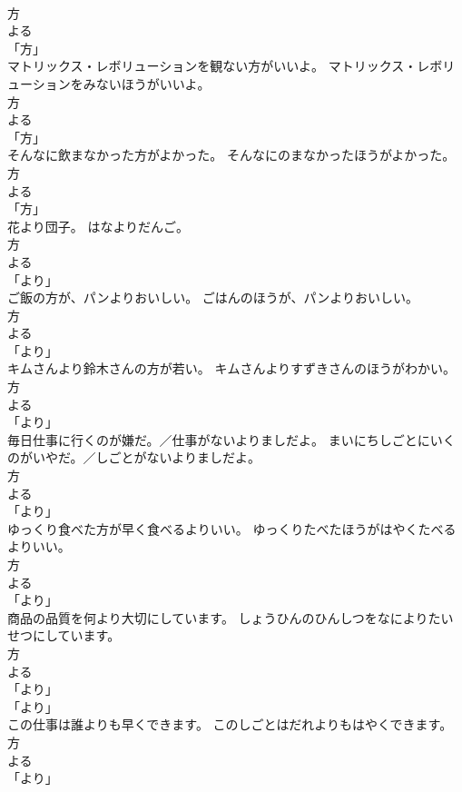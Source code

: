 \documentclass[8pt]{extreport}
\begin{document}
\begin{CJK}{UTF8}{min}
\\	方 
\\	よる 
\\	「方」 
\\	マトリックス・レボリューションを観ない方がいいよ。	マトリックス・レボリューションをみないほうがいいよ。	
\\	方 
\\	よる 
\\	「方」 
\\	そんなに飲まなかった方がよかった。	そんなにのまなかったほうがよかった。	
\\	方 
\\	よる 
\\	「方」 
\\	花より団子。	はなよりだんご。	
\\	方 
\\	よる 
\\	「より」 
\\	ご飯の方が、パンよりおいしい。	ごはんのほうが、パンよりおいしい。	
\\	方 
\\	よる 
\\	「より」 
\\	キムさんより鈴木さんの方が若い。	キムさんよりすずきさんのほうがわかい。	
\\	方 
\\	よる 
\\	「より」 
\\	毎日仕事に行くのが嫌だ。／仕事がないよりましだよ。	まいにちしごとにいくのがいやだ。／しごとがないよりましだよ。	
\\	方 
\\	よる 
\\	「より」 
\\	ゆっくり食べた方が早く食べるよりいい。	ゆっくりたべたほうがはやくたべるよりいい。	
\\	方 
\\	よる 
\\	「より」 
\\	商品の品質を何より大切にしています。	しょうひんのひんしつをなによりたいせつにしています。	
\\	方 
\\	よる 
\\	「より」 
\\	「より」 
\\	この仕事は誰よりも早くできます。	このしごとはだれよりもはやくできます。	
\\	方 
\\	よる 
\\	「より」 

\end{CJK}
\end{document}

